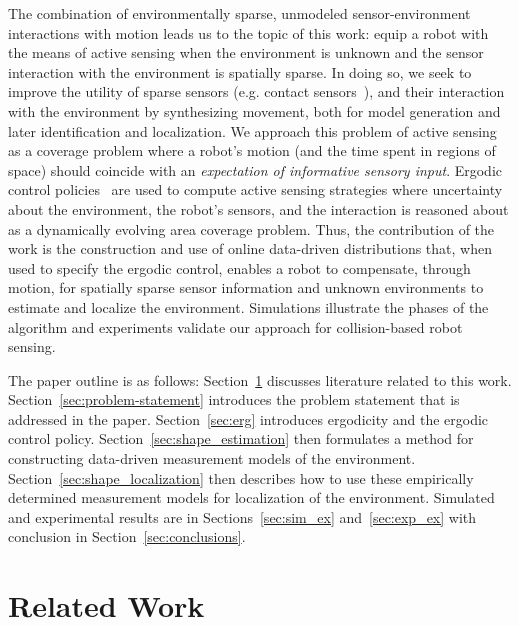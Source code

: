 \documentclass[conference]{IEEEtran}
\begin{document}
The combination of environmentally sparse, unmodeled sensor-environment interactions with motion leads us to the topic of this work: equip a robot with the means of active sensing when the environment is unknown and the sensor interaction with the environment is spatially sparse.
In doing so, we seek to improve the utility of sparse sensors (e.g. contact sensors~\cite{meierTRO11probApproachTactileShape, mitchinson2007feedback, hobbs2015spatiotemporal}), and their interaction with the environment by synthesizing movement, both for model generation and later identification and localization.
We approach this problem of active sensing as a coverage problem where a robot's motion (and the time spent in regions of space) should coincide with an \emph{expectation of informative sensory input}.
Ergodic control policies~\cite{shellMult06ergodic, mathew2011metrics, miller2013trajectory,miller2016ergodic} are used to compute active sensing strategies where uncertainty about the environment, the robot's sensors, and the interaction is reasoned about as a dynamically evolving area coverage problem. 
Thus, the contribution of the work is the construction and use of online data-driven distributions that, when used to specify the ergodic control, enables a robot to compensate, through motion, for spatially sparse sensor information and unknown environments to estimate and localize the environment. 
Simulations illustrate the phases of the algorithm and experiments validate our approach for collision-based robot sensing.


The paper outline is as follows: Section~\ref{sec:related_work} discusses literature related to this work. 
Section~\ref{sec:problem-statement} introduces the problem statement that is addressed in the paper.
Section~\ref{sec:erg} introduces ergodicity and the ergodic control policy.
Section~\ref{sec:shape_estimation} then formulates a method for constructing data-driven measurement models of the environment.
Section~\ref{sec:shape_localization} then describes how to use these empirically determined measurement models for localization of the environment.
Simulated and experimental results are in Sections~\ref{sec:sim_ex} and~\ref{sec:exp_ex} with conclusion in Section~\ref{sec:conclusions}.

\section{Related Work}
\label{sec:related_work}
\end{document}
